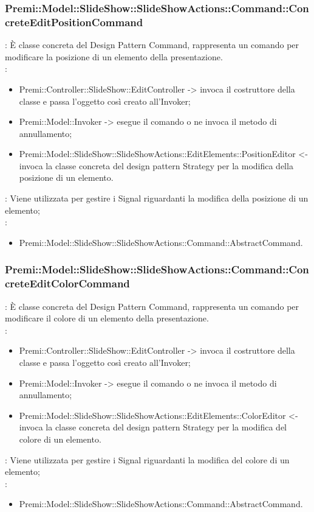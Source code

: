 {                    \subsubsection{Premi::Model::SlideShow::SlideShowActions::Command::ConcreteEditPositionCommand}{
				\textbf{\tipo}: È classe concreta del Design Pattern Command, rappresenta un comando per modificare la posizione di un elemento della presentazione.\\	
				\textbf{\relaz}: 
				\begin{itemize}
					\item Premi::Controller::SlideShow::EditController -> invoca il costruttore della classe e passa l’oggetto così creato all’Invoker;
                    \item Premi::Model::Invoker -> esegue il comando o ne invoca il metodo di annullamento;
                    \item Premi::Model::SlideShow::SlideShowActions::EditElements::PositionEditor <- invoca la classe concreta del design pattern Strategy per la modifica della posizione di un elemento.
				\end{itemize}	
                \textbf{\interfacce}: Viene utilizzata per gestire i Signal riguardanti la modifica della posizione di un elemento;\\
                \textbf{\base}: 
                    \begin{itemize}
                    \item Premi::Model::SlideShow::SlideShowActions::Command::AbstractCommand.
                    \end{itemize}
                    }
                    \subsubsection{Premi::Model::SlideShow::SlideShowActions::Command::ConcreteEditColorCommand}{
				\textbf{\tipo}: È classe concreta del Design Pattern Command, rappresenta un comando per modificare il colore di un elemento della presentazione.\\	
				\textbf{\relaz}: 
				\begin{itemize}
					\item Premi::Controller::SlideShow::EditController -> invoca il costruttore della classe e passa l’oggetto così creato all’Invoker;
                    \item Premi::Model::Invoker -> esegue il comando o ne invoca il metodo di annullamento;
                    \item Premi::Model::SlideShow::SlideShowActions::EditElements::ColorEditor <- invoca la classe concreta del design pattern Strategy per la modifica del colore di un elemento.
				\end{itemize}	
                \textbf{\interfacce}: Viene utilizzata per gestire i Signal riguardanti la modifica del colore di un elemento;\\
                \textbf{\base}: 
                    \begin{itemize}
                    \item Premi::Model::SlideShow::SlideShowActions::Command::AbstractCommand.
                    \end{itemize}
                    }
}
